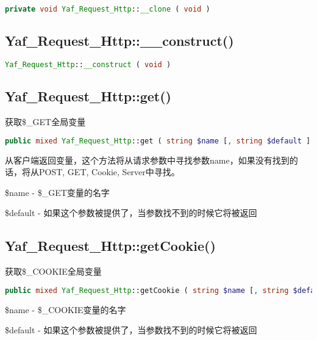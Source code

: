 \begin{lstlisting}[language=PHP]
private void Yaf_Request_Http::__clone ( void )
\end{lstlisting}

\subsection{Yaf\_Request\_Http::\_\_construct()}


\begin{lstlisting}[language=PHP]
Yaf_Request_Http::__construct ( void )
\end{lstlisting}

\subsection{Yaf\_Request\_Http::get()}

获取\$\_GET全局变量

\begin{lstlisting}[language=PHP]
public mixed Yaf_Request_Http::get ( string $name [, string $default ] )
\end{lstlisting}


从客户端返回变量，这个方法将从请求参数中寻找参数name，如果没有找到的话，将从POST, GET, Cookie, Server中寻找。

\begin{compactitem}
\item \$name - \$\_GET变量的名字
\item \$default - 如果这个参数被提供了，当参数找不到的时候它将被返回
\end{compactitem}

\subsection{Yaf\_Request\_Http::getCookie()}

获取\$\_COOKIE全局变量

\begin{lstlisting}[language=PHP]
public mixed Yaf_Request_Http::getCookie ( string $name [, string $default ] )
\end{lstlisting}

\begin{compactitem}
\item \$name - \$\_COOKIE变量的名字
\item \$default - 如果这个参数被提供了，当参数找不到的时候它将被返回
\end{compactitem}

